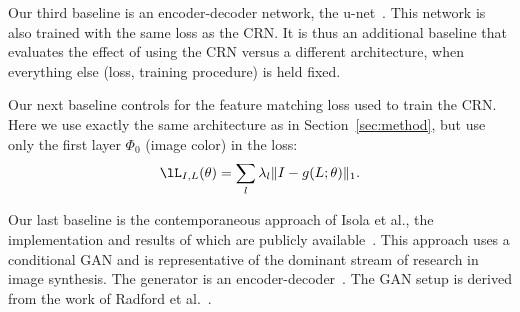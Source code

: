 Our third baseline is an encoder-decoder network, the u-net~\cite{Ronneberger2015}. This network is also trained with the same loss as the CRN. It is thus an additional baseline that evaluates the effect of using the CRN versus a different architecture, when everything else (loss, training procedure) is held fixed.%

Our next baseline controls for the feature matching loss used to train the CRN. Here we use exactly the same architecture as in Section~\ref{sec:method}, but use only the first layer $\Phi_0$ (image color) in the loss:
\begin{equation}
\lL_{I,L}(\theta) = \sum_l{\lambda_l\| I-g(L;\theta)\|_1}.
\label{eq:loss-color}
\end{equation}


Our last baseline is the contemporaneous approach of Isola et al., the implementation and results of which are publicly available~\cite{Isola2017}. This approach uses a conditional GAN and is representative of the dominant stream of research in image synthesis. The generator is an encoder-decoder~\cite{Ronneberger2015}. The GAN setup is derived from the work of Radford et al.~\cite{Radford2016}.

